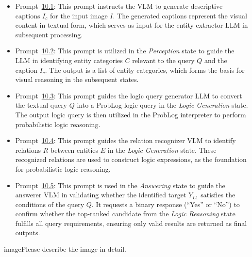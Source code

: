 \begin{itemize}
    \item Prompt~\hyperref[prompt:caption]{10.1}: This prompt instructs the VLM to generate descriptive captions $I_c$ for the input image $I$. The generated captions represent the visual content in textual form, which serves as input for the entity extractor LLM in subsequent processing.

    \item Prompt~\hyperref[prompt:entity_extractor]{10.2}: This prompt is utilized in the \emph{Perception} state to guide the LLM in identifying entity categories $C$ relevant to the query $Q$ and the caption $I_c$. The output is a list of entity categories, which forms the basis for visual reasoning in the subsequent states.

    \item Prompt~\hyperref[prompt:logic_query]{10.3}: This prompt guides the logic query generator LLM to convert the textual query $Q$ into a ProbLog logic query in the \emph{Logic Generation} state. The output logic query is then utilized in the ProbLog interpreter to perform probabilistic logic reasoning.

    \item Prompt~\hyperref[prompt:relation]{10.4}: This prompt guides the relation recognizer VLM to identify relations $R$ between entities $E$ in the \emph{Logic Generation} state. These recognized relations are used to construct logic expressions, as the foundation for probabilistic logic reasoning.

    \item Prompt~\hyperref[prompt:answerer]{10.5}: This prompt is used in the \emph{Answering} state to guide the answerer VLM in validating whether the identified target $Y_{L1}$ satisfies the conditions of the query $Q$. It requests a binary response (``Yes'' or ``No'') to confirm whether the top-ranked candidate from the \emph{Logic Reasoning} state fulfills all query requirements, ensuring only valid results are returned as final outputs.
\end{itemize}

\begin{prompt}[title={Prompt \thetcbcounter: Captioner VLM}] \label{prompt:caption}
\textlangle image\textrangle Please describe the image in detail.
\end{prompt}

